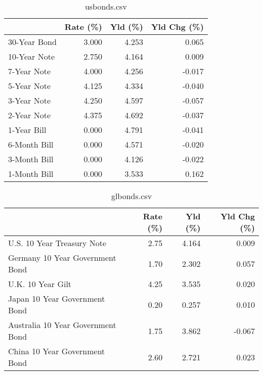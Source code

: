 \documentclass{article}%
\begin{document}
%


\begin{table}[htbp]%
\caption{usbonds.csv}%
\centering%
\begin{adjustbox}{width=1\textwidth}%
\begin{tabular}{lrrr}
\toprule
             &  Rate (\%) &  Yld (\%) &  Yld Chg (\%) \\
\midrule
30-Year Bond &     3.000 &    4.253 &        0.065 \\
10-Year Note &     2.750 &    4.164 &        0.009 \\
 7-Year Note &     4.000 &    4.256 &       -0.017 \\
 5-Year Note &     4.125 &    4.334 &       -0.040 \\
 3-Year Note &     4.250 &    4.597 &       -0.057 \\
 2-Year Note &     4.375 &    4.692 &       -0.037 \\
 1-Year Bill &     0.000 &    4.791 &       -0.041 \\
6-Month Bill &     0.000 &    4.571 &       -0.020 \\
3-Month Bill &     0.000 &    4.126 &       -0.022 \\
1-Month Bill &     0.000 &    3.533 &        0.162 \\
\bottomrule
\end{tabular}
%
\end{adjustbox}%
\end{table}

%


\begin{table}[htbp]%
\caption{glbonds.csv}%
\centering%
\begin{adjustbox}{width=1\textwidth}%
\begin{tabular}{lrrr}
\toprule
                                  &  Rate (\%) &  Yld (\%) &  Yld Chg (\%) \\
\midrule
       U.S. 10 Year Treasury Note &      2.75 &    4.164 &        0.009 \\
  Germany 10 Year Government Bond &      1.70 &    2.302 &        0.057 \\
                U.K. 10 Year Gilt &      4.25 &    3.535 &        0.020 \\
    Japan 10 Year Government Bond &      0.20 &    0.257 &        0.010 \\
Australia 10 Year Government Bond &      1.75 &    3.862 &       -0.067 \\
    China 10 Year Government Bond &      2.60 &    2.721 &        0.023 \\
\bottomrule
\end{tabular}
%
\end{adjustbox}%
\end{table}
\end{document}
